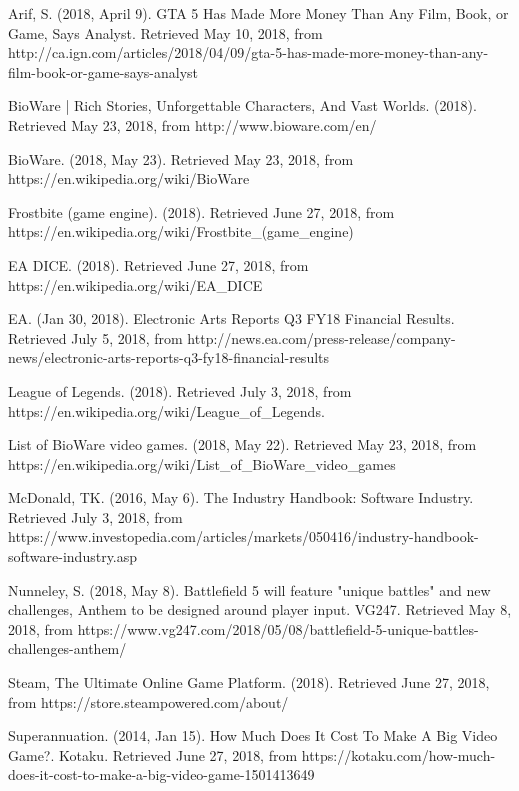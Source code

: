 \documentclass[10pt,letterpaper]{article}
\begin{document}
\clearpage
\begin{thebibliography}{}
	
	Arif, S. (2018, April 9). GTA 5 Has Made More Money Than Any Film, Book, or Game, Says Analyst. Retrieved May 10, 2018, from http://ca.ign.com/articles/2018/04/09/gta-5-has-made-more-money-than-any-film-book-or-game-says-analyst

	BioWare | Rich Stories, Unforgettable Characters, And Vast Worlds. (2018). Retrieved May 23, 2018, from http://www.bioware.com/en/

	BioWare. (2018, May 23). Retrieved May 23, 2018, from https://en.wikipedia.org/wiki/BioWare

	Frostbite (game engine). (2018). Retrieved June 27, 2018, from https://en.wikipedia.org/wiki/Frostbite\_(game\_engine)

	EA DICE. (2018). Retrieved June 27, 2018, from https://en.wikipedia.org/wiki/EA\_DICE

	EA. (Jan 30, 2018). Electronic Arts Reports Q3 FY18 Financial Results. Retrieved July 5, 2018, from http://news.ea.com/press-release/company-news/electronic-arts-reports-q3-fy18-financial-results

	League of Legends. (2018). Retrieved July 3, 2018, from https://en.wikipedia.org/wiki/League\_of\_Legends.

	List of BioWare video games. (2018, May 22). Retrieved May 23, 2018, from https://en.wikipedia.org/wiki/List\_of\_BioWare\_video\_games

	McDonald, TK. (2016, May 6). The Industry Handbook: Software Industry. Retrieved July 3, 2018, from https://www.investopedia.com/articles/markets/050416/industry-handbook-software-industry.asp

	Nunneley, S. (2018, May 8). Battlefield 5 will feature "unique battles" and new challenges, Anthem to be designed around player input. VG247. Retrieved May 8, 2018, from https://www.vg247.com/2018/05/08/battlefield-5-unique-battles-challenges-anthem/

	Steam, The Ultimate Online Game Platform. (2018). Retrieved June 27, 2018, from https://store.steampowered.com/about/

	Superannuation. (2014, Jan 15). How Much Does It Cost To Make A Big Video Game?. Kotaku. Retrieved June 27, 2018, from https://kotaku.com/how-much-does-it-cost-to-make-a-big-video-game-1501413649


\end{thebibliography}
\end{document}
